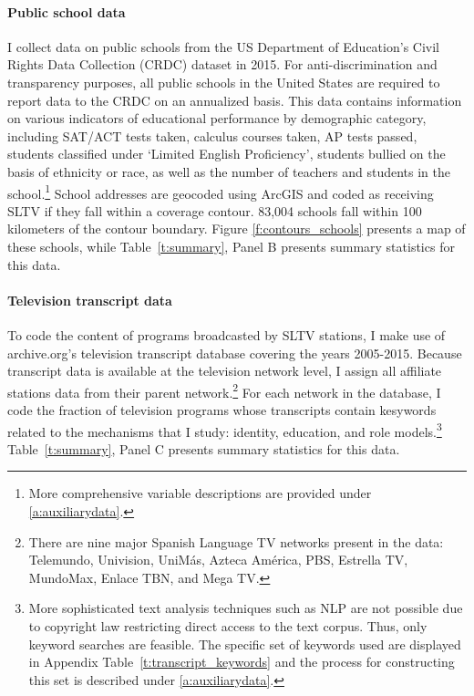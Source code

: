 \documentclass[11pt]{article}
\begin{document}
\paragraph{Public school data} I collect data on public schools from the US Department of Education's Civil Rights Data Collection (CRDC) dataset in 2015. For anti-discrimination and transparency purposes, all public schools in the United States are required to report data to the CRDC on an annualized basis. This data contains information on various indicators of educational performance by demographic category, including SAT/ACT tests taken, calculus courses taken, AP tests passed, students classified under `Limited English Proficiency', students bullied on the basis of ethnicity or race, as well as the number of teachers and students in the school.\footnote{More comprehensive variable descriptions are provided under \ref{a:auxiliarydata}.} School addresses are geocoded using ArcGIS and coded as receiving SLTV if they fall within a coverage contour. 83,004 schools fall within 100 kilometers of the contour boundary. Figure \ref{f:contours_schools} presents a map of these schools, while Table~\ref{t:summary}, Panel B presents summary statistics for this data. 


\paragraph{Television transcript data} To code the content of programs broadcasted by SLTV stations, I make use of archive.org's television transcript database covering the years 2005-2015. Because transcript data is available at the television network level, I assign all affiliate stations data from their parent network.\footnote{There are nine major Spanish Language TV networks present in the data: Telemundo, Univision, UniMás, Azteca América, PBS, Estrella TV, MundoMax, Enlace TBN, and Mega TV. } For each network in the database, I code the fraction of television programs whose transcripts contain kesywords related to the mechanisms that I study: identity, education, and role models.\footnote{More sophisticated text analysis techniques such as NLP are not possible due to copyright law restricting direct access to the text corpus. Thus, only keyword searches are feasible. The specific set of keywords used are displayed in Appendix Table~\ref{t:transcript_keywords} and the process for constructing this set is described under \ref{a:auxiliarydata}.}  Table~\ref{t:summary}, Panel C presents summary statistics for this data. 
\end{document}
